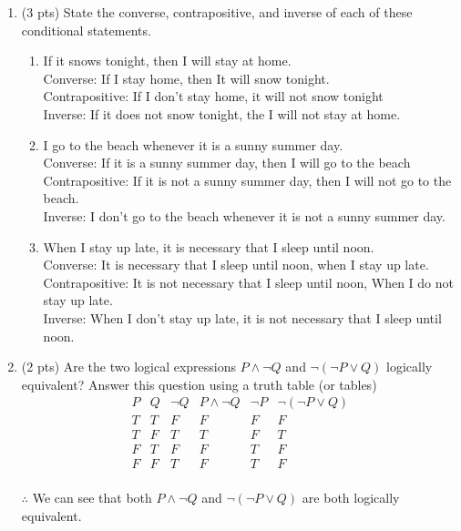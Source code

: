 \documentclass[12pt]{article}
\begin{document}
\begin{enumerate}
\item (3 pts)
State the converse, contrapositive, and inverse of each of
these conditional statements.
\begin{enumerate}

\item If it snows tonight, then I will stay at home.
\\Converse: If I stay home, then It will snow tonight.
\\Contrapositive: If I don't stay home, it will not snow tonight
\\Inverse: If it does not snow tonight, the I will not stay at home.\\

\item I go to the beach whenever it is a sunny summer day.
\\Converse: If it is a sunny summer day, then I will go to the beach
\\Contrapositive: If it is not a sunny summer day, then I will not go to the beach.
\\Inverse: I don't go to the beach whenever it is not a sunny summer day.\\

\item When I stay up late, it is necessary that I sleep until noon.
\\Converse: It is necessary that I sleep until noon, when I stay up late.
\\Contrapositive: It is not necessary that I sleep until noon, When I do not stay up late.
\\Inverse: When I don't stay up late, it is not necessary that I sleep until noon.
\end{enumerate}


\item (2 pts) Are the two logical expressions \(P \wedge \neg Q\) and \(\neg (\neg P \vee Q)\) logically equivalent? Answer this question using a truth table (or tables)
    \begin{displaymath}
    \begin{array}{|c|c|c|c|c|c|}
    P & Q & \lnot Q & P \land \lnot Q & \lnot P & \lnot (\lnot P \lor Q)\\
    \hline
      T & T & F & F & F & F\\
      T & F & T & T & F & T\\
      F & T & F & F & T & F\\
      F & F & T & F & T & F

    \end{array}
    \end{displaymath}
    \\ $\therefore$ We can see that both $P \land \lnot Q$ and $\lnot (\lnot P \lor Q)$ are both logically equivalent.


\end{enumerate}
\end{document}
